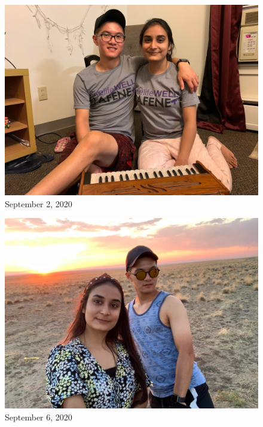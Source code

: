 \documentclass[
]{book}
\begin{document}
\begin{figure}
\centering
\includegraphics[width=5.20833in,height=\textheight]{mimages/1 9-2-2020.jpg}
\caption{September 2, 2020}
\end{figure}

\begin{figure}
\centering
\includegraphics[width=5.20833in,height=\textheight]{mimages/2 9-6-2020.jpg}
\caption{September 6, 2020}
\end{figure}
\end{document}
